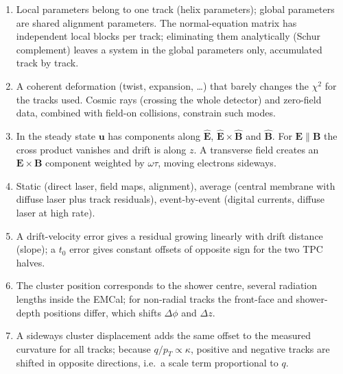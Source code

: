 \documentclass[11pt,letterpaper]{article}
\begin{document}
\begin{enumerate}[label=A\arabic*.]
\item Local parameters belong to one track (helix parameters); global parameters are shared alignment parameters. The normal-equation matrix has independent local blocks per track; eliminating them analytically (Schur complement) leaves a system in the global parameters only, accumulated track by track.
\item A coherent deformation (twist, expansion, \dots) that barely changes the $\chi^2$ for the tracks used. Cosmic rays (crossing the whole detector) and zero-field data, combined with field-on collisions, constrain such modes.
\item In the steady state $\mathbf{u}$ has components along $\hat{\mathbf E}$, $\hat{\mathbf E}\times\hat{\mathbf B}$ and $\hat{\mathbf B}$. For $\mathbf{E}\parallel\mathbf{B}$ the cross product vanishes and drift is along $z$. A transverse field creates an $\mathbf{E}\times\mathbf{B}$ component weighted by $\omega\tau$, moving electrons sideways.
\item Static (direct laser, field maps, alignment), average (central membrane with diffuse laser plus track residuals), event-by-event (digital currents, diffuse laser at high rate).
\item A drift-velocity error gives a residual growing linearly with drift distance (slope); a $t_0$ error gives constant offsets of opposite sign for the two TPC halves.
\item The cluster position corresponds to the shower centre, several radiation lengths inside the EMCal; for non-radial tracks the front-face and shower-depth positions differ, which shifts $\Delta\phi$ and $\Delta z$.
\item A sideways cluster displacement adds the same offset to the measured curvature for all tracks; because $q/p_T\propto\kappa$, positive and negative tracks are shifted in opposite directions, i.e.\ a scale term proportional to $q$.
\end{enumerate}
\end{document}
